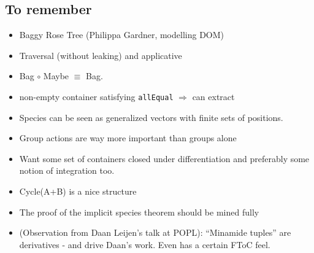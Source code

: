 \documentclass{article} %
\theoremstyle{plain}
\theoremstyle{definition}
\begin{document}
\subsection{To remember}
\begin{itemize}
\item Baggy Rose Tree (Philippa Gardner, modelling DOM)
\item Traversal (without leaking) and applicative
\item Bag $\circ$ Maybe $\equiv$ Bag.
\item non-empty container satisfying \texttt{allEqual} $\Rightarrow$ can
extract
\item Species can be seen as generalized vectors with finite sets of
positions.
\item Group actions are way more important than groups alone
\item Want some set of containers closed under differentiation and
preferably some notion of integration too.
\item Cycle(A+B) is a nice structure
\item The proof of the implicit species theorem should be mined fully
\item (Observation from Daan Leijen's talk at POPL): ``Minamide tuples''
are derivatives - and drive Daan's work. Even has a certain FToC feel.
\end{itemize}
\end{document}
